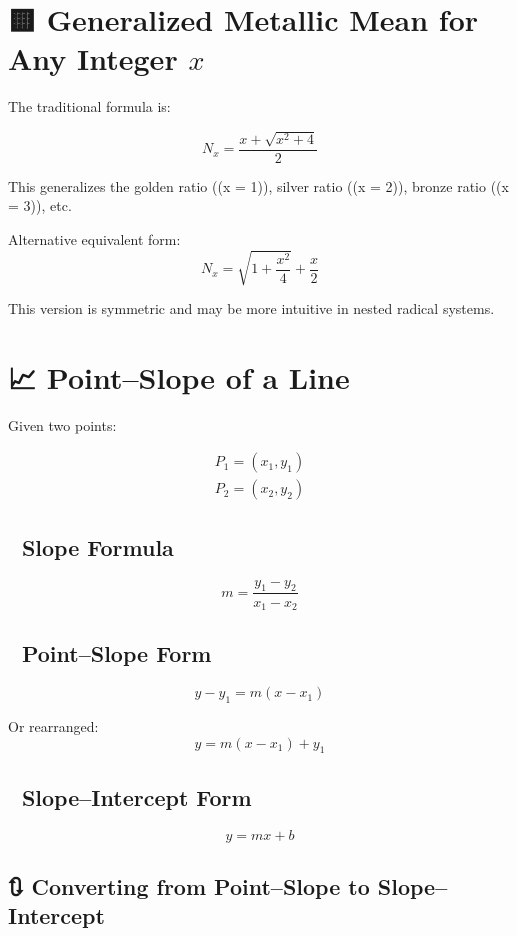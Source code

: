 \documentclass[
  letterpaper,
]{book}
\begin{document}
\section{\texorpdfstring{🟨 Generalized Metallic Mean for Any Integer
\(x\)}{🟨 Generalized Metallic Mean for Any Integer x}}\label{generalized-metallic-mean-for-any-integer-x}

The traditional formula is:

\[
N_x = \frac{x + \sqrt{x^2 + 4}}{2}
\]

This generalizes the golden ratio ((x = 1)), silver ratio ((x = 2)),
bronze ratio ((x = 3)), etc.

Alternative equivalent form: \[
N_x = \sqrt{1 + \frac{x^2}{4}} + \frac{x}{2}
\]

This version is symmetric and may be more intuitive in nested radical
systems.

\section{📈 Point--Slope of a Line}\label{pointslope-of-a-line}

Given two points:

\[
\begin{gather}
P_1 = (x_1, y_1) \\[6pt]
P_2 = (x_2, y_2)
\end{gather}
\]

\subsection{🧮 Slope Formula}\label{slope-formula}

\[
m = \frac{y_1 - y_2}{x_1 - x_2}
\]

\subsection{🧾 Point--Slope Form}\label{pointslope-form}

\[
y - y_1 = m(x - x_1)
\]

Or rearranged: \[
y = m(x - x_1) + y_1
\]

\subsection{🎯 Slope--Intercept Form}\label{slopeintercept-form}

\[
y = mx + b
\]

\subsection{🔃 Converting from Point--Slope to
Slope--Intercept}\label{converting-from-pointslope-to-slopeintercept}
\end{document}
